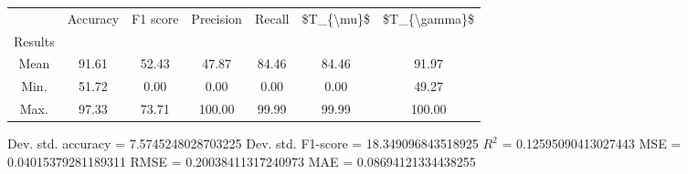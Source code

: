 \begin{tabular}{|c|c|c|c|c|c|c|}
\toprule
{} &  Accuracy &  F1 score &  Precision &  Recall &  \$T\_\{\textbackslash mu\}\$ &  \$T\_\{\textbackslash gamma\}\$ \\
Results &           &           &            &         &            &               \\
\hline
Mean    &     91.61 &     52.43 &      47.87 &   84.46 &      84.46 &         91.97 \\
Min.    &     51.72 &      0.00 &       0.00 &    0.00 &       0.00 &         49.27 \\
Max.    &     97.33 &     73.71 &     100.00 &   99.99 &      99.99 &        100.00 \\
\bottomrule
\end{tabular}

 Dev. std. accuracy = 7.5745248028703225
 Dev. std. F1-score = 18.349096843518925
 $R^2$ = 0.12595090413027443
 MSE = 0.04015379281189311
 RMSE = 0.20038411317240973
 MAE = 0.08694121334438255